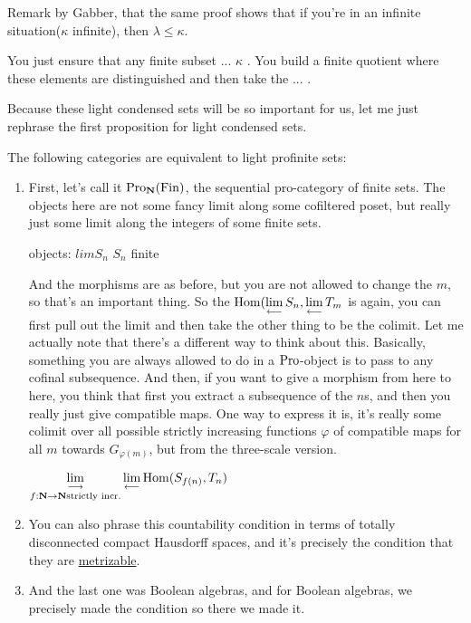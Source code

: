 \begin{example}
\begin{remark}
Remark by Gabber, that the same proof shows that if you're in an infinite situation($\kappa$ infinite), then $\lambda \leq \kappa$.
\end{remark}

You just ensure that any finite subset ... $\kappa$ . You build a finite quotient where these elements are distinguished and then take the ... .

Because these light condensed sets will be so important for us, let me just rephrase the first proposition for light condensed sets. 

\begin{proposition}
The following categories are equivalent to light profinite sets:
\begin{enumerate}
\item First, let's call it $\operatorname{Pro}_\mathbf N(\operatorname{Fin})$, the sequential pro-category of finite sets. The objects here are not some fancy limit along some cofiltered poset, but really just some limit along the integers of some finite sets. 

objects: $lim S_n$ $S_n$ finite

And the morphisms are as before, but you are not allowed to change the $m$, so that's an important thing. So the $\operatorname{Hom}(\mathop{\operatorname*{lim}\limits_{\longleftarrow}}\limits S_n, \mathop{\operatorname*{lim}\limits_{\longleftarrow}}\limits T_m$ is again, you can first pull out the limit and then take the other thing to be the colimit. 
Let me actually note that there's a different way to think about this. Basically, something you are always allowed to do in a $\operatorname{Pro}$-object is to pass to any cofinal subsequence. And then, if you want to give a morphism from here to here, you think that first you extract a subsequence of the $n$s, and then you really just give compatible maps. One way to express it is, it's really some colimit over all possible strictly increasing functions $\varphi$ of compatible maps for all $m$ towards $G_{\varphi(m)}$, but from the three-scale version.

$\mathop{\operatorname*{lim}\limits_{\longrightarrow}}\limits_{f: \mathbf N \to \mathbf N \text{strictly incr.}} \mathop{\operatorname*{lim}\limits_{\longleftarrow}}\limits \operatorname{Hom}(S_{f(n)}, T_n)$ 


\item You can also phrase this countability condition in terms of totally disconnected compact Hausdorff spaces, and it's precisely the condition that they are \underline{metrizable}. 

\item And the last one was Boolean algebras, and for Boolean algebras, we precisely made the condition so there we made it.


\end{enumerate}
\end{proposition}
\end{example}
